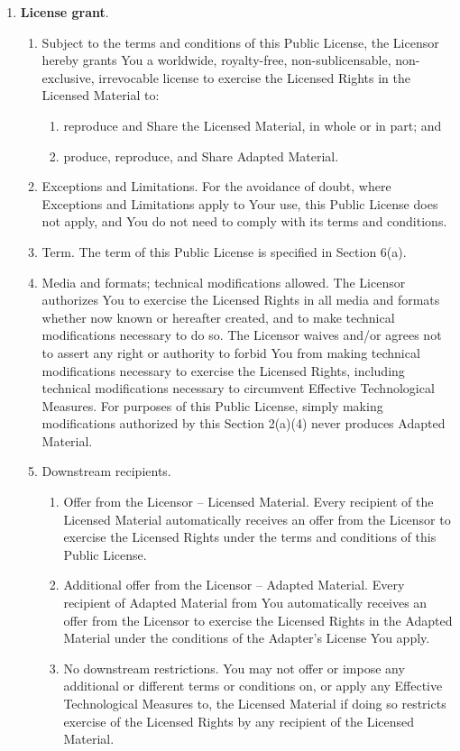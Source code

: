 \begin{enumerate}
\item \textbf{License grant}.
\begin{enumerate}
\item Subject to the terms and conditions of this Public License, the Licensor hereby grants You a worldwide, royalty-free, non-sublicensable, non-exclusive, irrevocable license to exercise the Licensed Rights in the Licensed Material to:
\begin{enumerate}
\item reproduce and Share the Licensed Material, in whole or in part; and
\item produce, reproduce, and Share Adapted Material.
\end{enumerate}
\item Exceptions and Limitations. For the avoidance of doubt, where Exceptions and Limitations apply to Your use, this Public License does not apply, and You do not need to comply with its terms and conditions.
\item Term. The term of this Public License is specified in Section 6(a).
\item Media and formats; technical modifications allowed. The Licensor authorizes You to exercise the Licensed Rights in all media and formats whether now known or hereafter created, and to make technical modifications necessary to do so. The Licensor waives and/or agrees not to assert any right or authority to forbid You from making technical modifications necessary to exercise the Licensed Rights, including technical modifications necessary to circumvent Effective Technological Measures. For purposes of this Public License, simply making modifications authorized by this Section 2(a)(4) never produces Adapted Material.
\item Downstream recipients.

\begin{enumerate}
\item Offer from the Licensor – Licensed Material. Every recipient of the Licensed Material automatically receives an offer from the Licensor to exercise the Licensed Rights under the terms and conditions of this Public License.
\item Additional offer from the Licensor – Adapted Material. Every recipient of Adapted Material from You automatically receives an offer from the Licensor to exercise the Licensed Rights in the Adapted Material under the conditions of the Adapter’s License You apply.
\item No downstream restrictions. You may not offer or impose any additional or different terms or conditions on, or apply any Effective Technological Measures to, the Licensed Material if doing so restricts exercise of the Licensed Rights by any recipient of the Licensed Material.
\end{enumerate}


\end{enumerate}
\end{enumerate}
